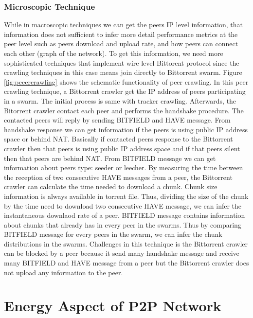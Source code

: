\subsubsection{Microscopic Technique}
While in macroscopic techniques we can get the peers IP level information, that information does not sufficient to infer more detail performance metrics at the peer level such as peers download and upload rate, and how peers can connect each other (graph of the network).
To get this information, we need more sophisticated techniques that implement wire level Bittorent protocol since the crawling techniques in this case means join directly to Bittorrent swarm.
Figure \ref{fig:peeercrawling} shows the schematic functionality of peer crawling.  
In this peer crawling technique, a Bittorrent crawler get the IP address of peers participating in a swarm.
The initial process is same with tracker crawling. 
Afterwards, the Bitorrent crawler contact each peer and performs the handshake procedure. 
The contacted peers will reply by sending BITFIELD and HAVE message.
From handshake response we can get information if the peers is using public IP address space or behind NAT. 
Basically if contacted peers response to the Bittorrent crawler then that peers is using public IP address space and if that peers silent then that peers are behind NAT.
From BITFIELD message we can get information about peers type: seeder or leecher.   
By measuring the time between the reception of two consecutive HAVE messages from a peer, the Bittorrent crawler can calculate the time needed to download a chunk.
Chunk size information is always available in torrent file.
Thus, dividing the size of the chunk by the time need to download two consecutive HAVE message, we can infer the instantaneous downlaod rate of a peer.
BITFIELD message contains information about chunks that already has in every peer in the swarms.  
Thus by comparing BITFIELD message for every peers in the swarm,  we can infer the chunk distributions in the swarms.
Challenges in this technique is the Bittorrent crawler can be blocked by a peer because it send many handshake message and receive many BITFIELD and HAVE message from a peer but the Bittorrent crawler does not upload any information to the peer.





\section{Energy Aspect of P2P Network}

